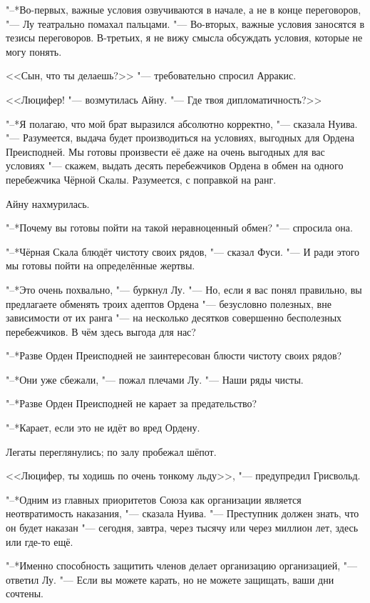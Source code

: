 "--*Во-первых, важные условия озвучиваются в начале, а не в конце переговоров, "--- Лу театрально помахал пальцами.
"--- Во-вторых, важные условия заносятся в тезисы переговоров.
В-третьих, я не вижу смысла обсуждать условия, которые не могу понять.

<<Сын, что ты делаешь?>> "--- требовательно спросил Арракис.

<<Люцифер! "--- возмутилась Айну.
"--- Где твоя дипломатичность?>>

"--*Я полагаю, что мой брат выразился абсолютно корректно, "--- сказала Нуива.
"--- Разумеется, выдача будет производиться на условиях, выгодных для Ордена Преисподней.
Мы готовы произвести её даже на очень выгодных для вас условиях "--- скажем, выдать десять перебежчиков Ордена в обмен на одного перебежчика Чёрной Скалы.
Разумеется, с поправкой на ранг.

Айну нахмурилась.

"--*Почему вы готовы пойти на такой неравноценный обмен? "--- спросила она.

"--*Чёрная Скала блюдёт чистоту своих рядов, "--- сказал Фуси.
"--- И ради этого мы готовы пойти на определённые жертвы.

"--*Это очень похвально, "--- буркнул Лу.
"--- Но, если я вас понял правильно, вы предлагаете обменять троих адептов Ордена "--- безусловно полезных, вне зависимости от их ранга "--- на несколько десятков совершенно бесполезных перебежчиков.
В чём здесь выгода для нас?

"--*Разве Орден Преисподней не заинтересован блюсти чистоту своих рядов?

"--*Они уже сбежали, "--- пожал плечами Лу.
"--- Наши ряды чисты.

"--*Разве Орден Преисподней не карает за предательство?

"--*Карает, если это не идёт во вред Ордену.

Легаты переглянулись;
по залу пробежал шёпот.

<<Люцифер, ты ходишь по очень тонкому льду>>, "--- предупредил Грисвольд.

"--*Одним из главных приоритетов Союза как организации является неотвратимость наказания, "--- сказала Нуива.
"--- Преступник должен знать, что он будет наказан "--- сегодня, завтра, через тысячу или через миллион лет, здесь или где-то ещё.

"--*Именно способность защитить членов делает организацию организацией, "--- ответил Лу.
"--- Если вы можете карать, но не можете защищать, ваши дни сочтены.

